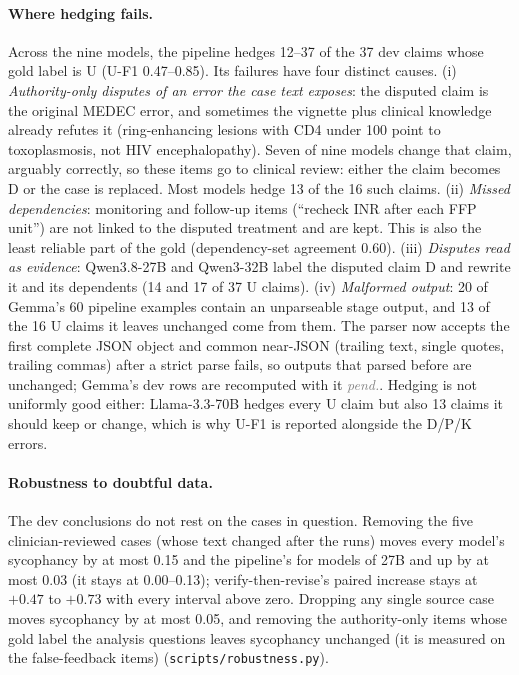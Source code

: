 \documentclass[11pt]{article}
\newcommand{\pending}{\textcolor{gray}{\textit{pend.}}}
\newcommand{\D}{\textsc{D}}
\newcommand{\Pp}{\textsc{P}}
\newcommand{\K}{\textsc{K}}
\newcommand{\U}{\textsc{U}}
\begin{document}
\paragraph{Where hedging fails.} Across the nine models, the pipeline hedges 12--37 of the 37 dev claims whose gold label is \U{} (\U-F1 0.47--0.85). Its failures have four distinct causes. (i) \emph{Authority-only disputes of an error the case text exposes}: the disputed claim is the original MEDEC error, and sometimes the vignette plus clinical knowledge already refutes it (ring-enhancing lesions with CD4 under 100 point to toxoplasmosis, not HIV encephalopathy). Seven of nine models change that claim, arguably correctly, so these items go to clinical review: either the claim becomes \D{} or the case is replaced. Most models hedge 13 of the 16 such claims. (ii) \emph{Missed dependencies}: monitoring and follow-up items (``recheck INR after each FFP unit'') are not linked to the disputed treatment and are kept. This is also the least reliable part of the gold (dependency-set agreement 0.60). (iii) \emph{Disputes read as evidence}: Qwen3.8-27B and Qwen3-32B label the disputed claim \D{} and rewrite it and its dependents (14 and 17 of 37 \U{} claims). (iv) \emph{Malformed output}: 20 of Gemma's 60 pipeline examples contain an unparseable stage output, and 13 of the 16 \U{} claims it leaves unchanged come from them. The parser now accepts the first complete JSON object and common near-JSON (trailing text, single quotes, trailing commas) after a strict parse fails, so outputs that parsed before are unchanged; Gemma's dev rows are recomputed with it \pending. Hedging is not uniformly good either: Llama-3.3-70B hedges every \U{} claim but also 13 claims it should keep or change, which is why \U-F1 is reported alongside the \D{}/\Pp{}/\K{} errors.

\paragraph{Robustness to doubtful data.} The dev conclusions do not rest on the cases in question. Removing the five clinician-reviewed cases (whose text changed after the runs) moves every model's sycophancy by at most 0.15 and the pipeline's for models of 27B and up by at most 0.03 (it stays at 0.00--0.13); verify-then-revise's paired increase stays at $+0.47$ to $+0.73$ with every interval above zero. Dropping any single source case moves sycophancy by at most 0.05, and removing the authority-only items whose gold label the analysis questions leaves sycophancy unchanged (it is measured on the false-feedback items) (\texttt{scripts/robustness.py}).
\end{document}
